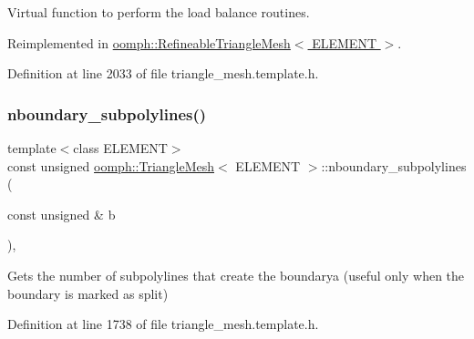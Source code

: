 Virtual function to perform the load balance routines. 



Reimplemented in \hyperlink{classoomph_1_1RefineableTriangleMesh_aaffa40b7d036f8ed8639bf9396f1088a}{oomph\+::\+Refineable\+Triangle\+Mesh$<$ E\+L\+E\+M\+E\+N\+T $>$}.



Definition at line 2033 of file triangle\+\_\+mesh.\+template.\+h.

\mbox{\label{classoomph_1_1TriangleMesh_aa735ba252e89f8dfe6b95a4b19970c25}} 
\subsubsection{\texorpdfstring{nboundary\+\_\+subpolylines()}{nboundary\_subpolylines()}}
{\footnotesize\ttfamily template$<$class E\+L\+E\+M\+E\+NT$>$ \\
const unsigned \hyperlink{classoomph_1_1TriangleMesh}{oomph\+::\+Triangle\+Mesh}$<$ E\+L\+E\+M\+E\+NT $>$\+::nboundary\+\_\+subpolylines (\begin{DoxyParamCaption}\item[{const unsigned \&}]{b }\end{DoxyParamCaption})\hspace{0.3cm}{\ttfamily [inline]}, {\ttfamily [protected]}}



Gets the number of subpolylines that create the boundarya (useful only when the boundary is marked as split) 



Definition at line 1738 of file triangle\+\_\+mesh.\+template.\+h.

\mbox{\label{classoomph_1_1TriangleMesh_a6f6f502f1ff32f126db888b621fcdb0b}} 
